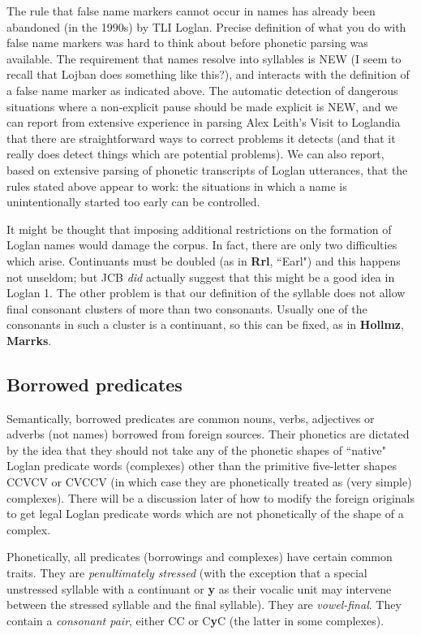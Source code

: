 \documentclass[12pt]{book}
\begin{document}
The rule that false name markers cannot occur in names has already been abandoned (in the 1990s) by TLI Loglan.  Precise definition of what you do with false name markers was hard to think about before phonetic parsing was available.  The requirement that names resolve into syllables is NEW (I seem to recall that Lojban does something like this?), and interacts with the definition of a false name marker as indicated above.   The automatic detection of dangerous situations where a non-explicit pause should be made explicit is NEW, and we can report from extensive experience in parsing Alex Leith's Visit to Loglandia that there are straightforward ways to correct problems it detects (and that it really does detect things which are potential problems).  We can also report, based on extensive parsing of phonetic transcripts of Loglan utterances, that the rules stated above appear to work:  the situations in which a name is unintentionally started too early can be controlled.

It might be thought that imposing additional restrictions on the formation of Loglan names would damage the corpus.  In fact, there are only two difficulties which arise.  Continuants must be doubled (as in {\bf Rrl}, ``Earl") and this happens not unseldom;  but JCB {\em did\/} actually suggest that this might be a good idea in Loglan 1.  The other problem is that our definition of the syllable does not allow final consonant clusters of more than two consonants.  Usually one of the consonants in such a cluster is a continuant, so this can be fixed, as in {\bf Hollmz}, {\bf Marrks}.

\subsection{Borrowed predicates}

Semantically, borrowed predicates are common nouns, verbs, adjectives or adverbs (not names) borrowed from foreign sources.  Their phonetics are dictated by the idea that they should not take any of the phonetic shapes of ``native" Loglan predicate words (complexes) other than the primitive five-letter shapes
CCVCV or CVCCV (in which case they are phonetically treated as (very simple) complexes).  There will be a discussion later of how to modify
the foreign originals to get legal Loglan predicate words which are not phonetically of the shape of a complex.

Phonetically, all predicates (borrowings and complexes) have certain common traits.  They are {\em penultimately stressed\/} (with the exception that a special unstressed syllable with a continuant or {\bf y} as their vocalic unit may intervene between the stressed syllable and the final syllable).  They are {\em vowel-final\/}.  They contain a {\em consonant pair\/}, either CC or C{\bf y}C (the latter in some complexes).
\end{document}

